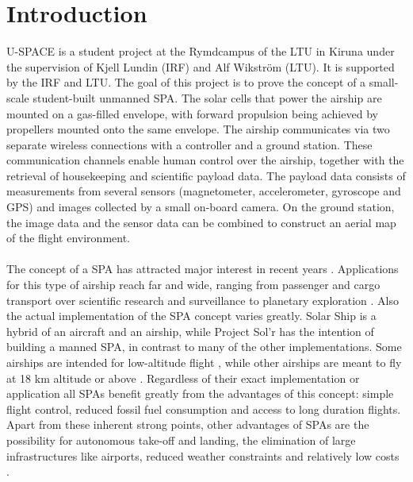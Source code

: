 \newpage
\chapter{Introduction}
\label{chap:introduction}

\enlargethispage{2.0em}

\ac{U-SPACE} is a student project at the Rymdcampus of the \ac{LTU} in Kiruna under the supervision of Kjell Lundin (\ac{IRF}) and Alf Wikström (\ac{LTU}). It is supported by the \ac{IRF} and \ac{LTU}. The goal of this project is to prove the concept of a small-scale student-built unmanned \ac{SPA}. The solar cells that power the airship are mounted on a gas-filled envelope, with forward propulsion being achieved by propellers mounted onto the same envelope. The airship communicates via two separate wireless connections with a controller and a ground station. These communication channels enable human control over the airship, together with the retrieval of housekeeping and scientific payload data. The payload data consists of measurements from several sensors (magnetometer, accelerometer, gyroscope and \ac{GPS}) and images collected by a small on-board camera. On the ground station, the image data and the sensor data can be combined to construct an aerial map of the flight environment.
\\
\\
The concept of a \ac{SPA} has attracted major interest in recent years \cite{website:ravenaerostar, website:gaya, poster:saba, report:colozza2004, website:solr, website:ISIS, website:helios, website:solarship}. Applications for this type of airship reach far and wide, ranging from passenger and cargo transport \cite{website:gaya, website:solr, website:helios, website:solarship} over scientific research \cite{poster:saba} and surveillance \cite{website:ravenaerostar, website:ISIS, website:helios} to planetary exploration \cite{report:colozza2004}. Also the actual implementation of the \ac{SPA} concept varies greatly. Solar Ship \cite{website:solarship} is a hybrid of an aircraft and an airship, while Project Sol'r \cite{website:solr} has the intention of building a manned \ac{SPA}, in contrast to many of the other implementations. Some airships are intended for low-altitude flight \cite{website:solr, website:helios}, while other airships are meant to fly at 18 km altitude or above \cite{website:ravenaerostar, poster:saba, website:ISIS}. Regardless of their exact implementation or application all \ac{SPA}s benefit greatly from the advantages of this concept: simple flight control, reduced fossil fuel consumption and access to long duration flights. Apart from these inherent strong points, other advantages of \ac{SPA}s are the possibility for autonomous take-off and landing, the elimination of large infrastructures like airports, reduced weather constraints and relatively low costs \cite{website:ravenaerostar, website:gaya}.

